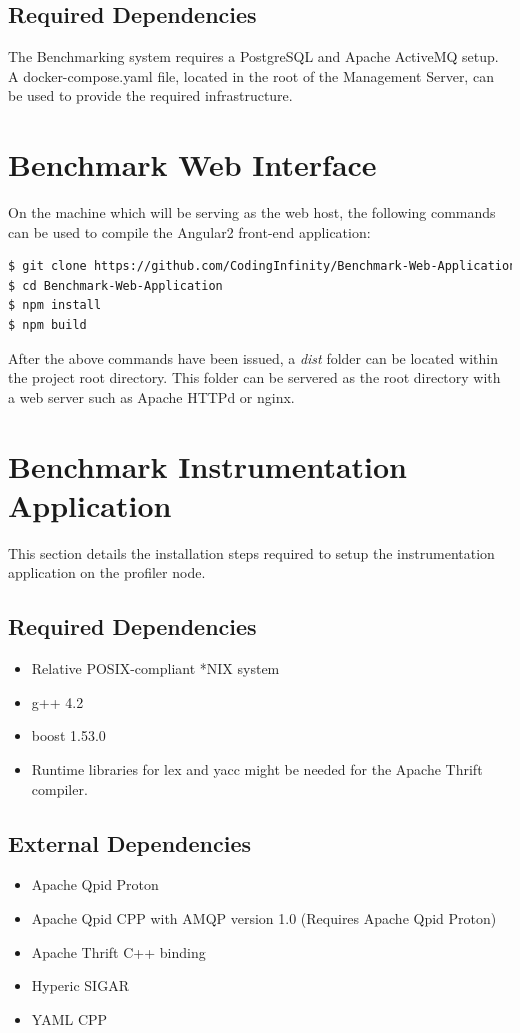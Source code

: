 \documentclass[11pt,a4paper]{article}
\begin{document}
\subsection{Required Dependencies}
The Benchmarking system requires a PostgreSQL and Apache ActiveMQ setup.
A docker-compose.yaml file, located in the root of the Management Server, can
be used to provide the required infrastructure.

\section{Benchmark Web Interface}
On the machine which will be serving as the web host, the following commands can
be used to compile the Angular2 front-end application:
\begin{lstlisting}[language=bash]
$ git clone https://github.com/CodingInfinity/Benchmark-Web-Application.git
$ cd Benchmark-Web-Application
$ npm install
$ npm build
\end{lstlisting}

After the above commands have been issued, a \textit{dist} folder can be located
within the project root directory. This folder can be servered as the root
directory with a web server such as Apache HTTPd or nginx.

\section{Benchmark Instrumentation Application}
This section details the installation steps required to setup the
instrumentation application on the profiler node.
\subsection{Required Dependencies}
\begin{itemize}
  \item Relative POSIX-compliant *NIX system
  \item g++ 4.2
  \item boost 1.53.0
  \item Runtime libraries for lex and yacc might be needed for the Apache Thrift compiler.
\end{itemize}

\subsection{External Dependencies}
\begin{itemize}
  \item Apache Qpid Proton
  \item Apache Qpid CPP with AMQP version 1.0 (Requires Apache Qpid Proton)
  \item Apache Thrift C++ binding
  \item Hyperic SIGAR
  \item YAML CPP
\end{itemize}
\end{document}
